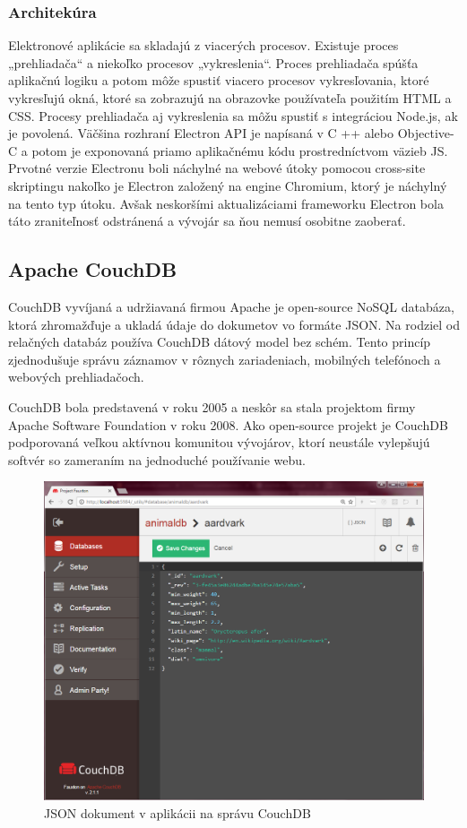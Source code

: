 \subsubsection{Architekúra}
\indent Elektronové aplikácie sa skladajú z viacerých procesov. Existuje proces „prehliadača“ a niekoľko procesov „vykreslenia“. Proces prehliadača spúšťa aplikačnú logiku a potom môže spustiť viacero procesov vykresľovania, ktoré vykresľujú okná, ktoré sa zobrazujú na obrazovke používateľa použitím HTML a CSS. Procesy prehliadača aj vykreslenia sa môžu spustiť s integráciou Node.js, ak je povolená.
\indent Väčšina rozhraní Electron API je napísaná v C ++ alebo Objective-C a potom je exponovaná priamo aplikačnému kódu prostredníctvom väzieb JS. Prvotné verzie Electronu boli náchylné na webové útoky pomocou cross-site skriptingu nakoľko je Electron založený na engine Chromium, ktorý je náchylný na tento typ útoku. Avšak neskoršími aktualizáciami frameworku Electron bola táto zraniteľnosť odstránená a vývojár sa ňou nemusí osobitne zaoberať\cite{electron}. 


\subsection{Apache CouchDB}
\indent CouchDB vyvíjaná a udržiavaná firmou Apache je open-source NoSQL databáza, ktorá zhromažďuje a ukladá údaje do dokumetov vo formáte JSON. Na rodziel od relačných databáz používa CouchDB dátový model bez schém. Tento princíp zjednodušuje správu záznamov v rôznych zariadeniach, mobilných telefónoch a webových prehliadačoch.

\indent CouchDB bola predstavená v roku 2005 a neskôr sa stala projektom firmy Apache Software Foundation v roku 2008. Ako open-source projekt je CouchDB podporovaná veľkou aktívnou komunitou vývojárov, ktorí neustále vylepšujú softvér so zameraním na jednoduché používanie webu\cite{coucdb}.

\begin{figure}[H]
    \centering
    \includegraphics[scale=0.25]{img/coucdb.png}
    \caption{JSON dokument v aplikácii na správu CouchDB\cite{coucdb}}
    \label{fig:couch_db}
\end{figure}

